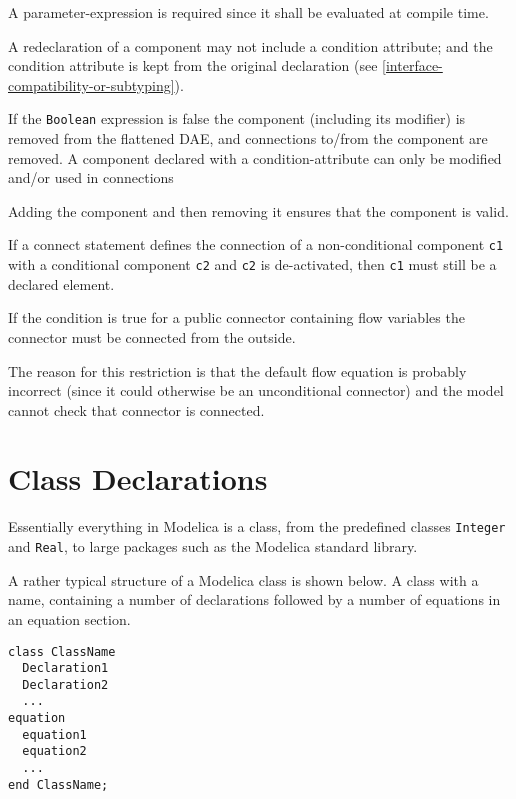 \begin{nonnormative}
A parameter-expression is required since it shall be evaluated at compile time.
\end{nonnormative}

A redeclaration of a component may not include a condition attribute;
and the condition attribute is kept from the original declaration (see
\cref{interface-compatibility-or-subtyping}).

If the \lstinline!Boolean! expression is false the component (including its modifier) is removed from the flattened DAE, and
connections to/from the component are removed.  A component declared with a condition-attribute can only be modified and/or
used in connections

\begin{nonnormative}
Adding the component and then removing it ensures that the component is valid.

If a connect statement defines the connection of a non-conditional component \lstinline!c1! with a conditional
component \lstinline!c2! and \lstinline!c2! is de-activated, then \lstinline!c1! must still be a declared element.
\end{nonnormative}

If the condition is true for a public connector containing flow
variables the connector must be connected from the outside.

\begin{nonnormative}
The reason for this restriction is that the default flow equation is probably incorrect (since it could otherwise
be an unconditional connector) and the model cannot check that connector is connected.
\end{nonnormative}

\section{Class Declarations}\label{class-declarations}

Essentially everything in Modelica is a class, from the predefined
classes \lstinline!Integer! and \lstinline!Real!, to large packages such as the Modelica
standard library.

\begin{example}
A rather typical structure of a Modelica class is
shown below. A class with a name, containing a number of declarations
followed by a number of equations in an equation section.

\begin{lstlisting}[language=modelica]
class ClassName
  Declaration1
  Declaration2
  ...
equation
  equation1
  equation2
  ...
end ClassName;
\end{lstlisting}
\end{example}

